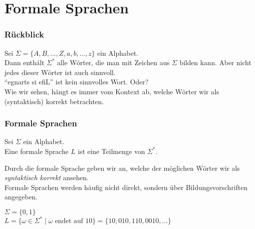 \section{Formale Sprachen}

\begin{frame}
	\frametitle{Rückblick}
	Sei $\Sigma = \{A, B, ..., Z, a, b, ..., z\}$ ein Alphabet.\\
	\pause
	Dann enthält $\Sigma^*$ alle Wörter, die man mit Zeichen aus $\Sigma$ bilden kann. Aber nicht jedes dieser Wörter ist auch sinnvoll.\\[1em]
	
	\enquote{egnarts si efiL} ist kein sinnvolles Wort. \pause Oder? \\[1em]
	\pause
	Wie wir sehen, hängt es immer vom Kontext ab, welche Wörter wir als (syntaktisch) korrekt betrachten.\\
	
\end{frame}

\begin{frame}
	\frametitle{Formale Sprachen}
		\begin{Definition}
			Sei $\Sigma$ ein Alphabet.\\
			Eine formale Sprache $L$ ist eine Teilmenge von $\Sigma^*$.
		\end{Definition}
		\pause
		\vspace{10pt}
		Durch die formale Sprache geben wir an, welche der möglichen Wörter wir als  \emph{syntaktisch korrekt} ansehen.\\
		\pause
		Formale Sprachen werden häufig nicht direkt, sondern über Bildungsvorschriften angegeben.
		
		\pause
		\begin{Beispiel}
			$\Sigma = \{0, 1\}$ \\
			$L = \{ \omega \in \Sigma^* \mid \omega \text{ endet auf } 10 \}  = \{10, 010, 110, 0010, ...\}$
		\end{Beispiel}
\end{frame}

